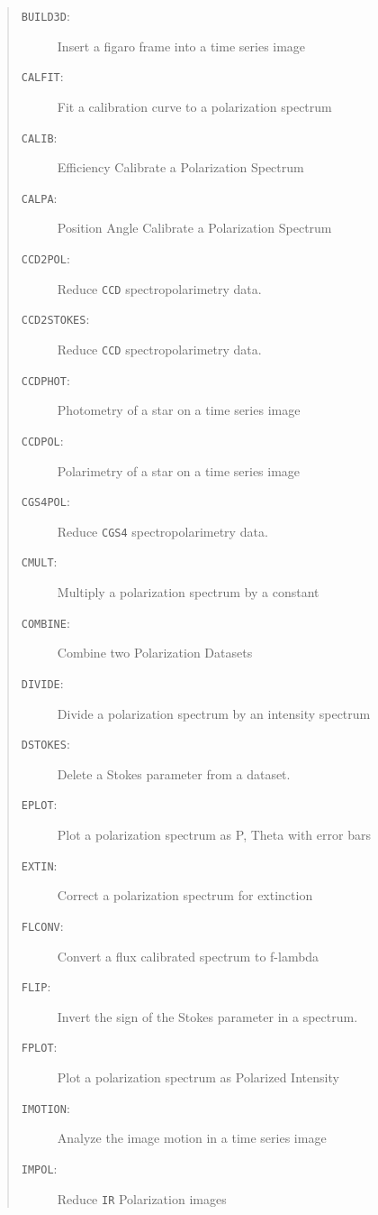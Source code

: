 \documentclass[11pt,twoside]{article}
\renewcommand{\_}{\texttt{\symbol{95}}}
\newenvironment{mansectionroutines}{\begin{quote}\begin{description}}%
{\end{description}\end{quote}}
\newcommand{\mansectionitem}[1]{\item[#1:]\mbox{}}
\newcommand{\mantt}{\tt}
\begin{document}
\begin{mansectionroutines}
\mansectionitem{{\mantt{BUILD3D}}}
        Insert a figaro frame into a time series image

\mansectionitem{{\mantt{CALFIT}}}
        Fit a calibration curve to a polarization spectrum

\mansectionitem{{\mantt{CALIB}}}
        Efficiency Calibrate a Polarization Spectrum

\mansectionitem{{\mantt{CALPA}}}
        Position Angle Calibrate a Polarization Spectrum

\mansectionitem{{\mantt{CCD2POL}}}
        Reduce {\mantt{CCD}} spectropolarimetry data.

\mansectionitem{{\mantt{CCD2STOKES}}}
        Reduce {\mantt{CCD}} spectropolarimetry data.

\mansectionitem{{\mantt{CCDPHOT}}}
        Photometry of a star on a time series image

\mansectionitem{{\mantt{CCDPOL}}}
        Polarimetry of a star on a time series image

\mansectionitem{{\mantt{CGS4POL}}}
        Reduce {\mantt{CGS4}} spectropolarimetry data.

\mansectionitem{{\mantt{CMULT}}}
        Multiply a polarization spectrum by a constant

\mansectionitem{{\mantt{COMBINE}}}
        Combine two Polarization Datasets

\mansectionitem{{\mantt{DIVIDE}}}
        Divide a polarization spectrum by an intensity spectrum

\mansectionitem{{\mantt{DSTOKES}}}
        Delete a Stokes parameter from a dataset.

\mansectionitem{{\mantt{EPLOT}}}
        Plot a polarization spectrum as P, Theta with error bars

\mansectionitem{{\mantt{EXTIN}}}
        Correct a polarization spectrum for extinction

\mansectionitem{{\mantt{FLCONV}}}
        Convert a flux calibrated spectrum to f-lambda

\mansectionitem{{\mantt{FLIP}}}
        Invert the sign of the Stokes parameter in a spectrum.

\mansectionitem{{\mantt{FPLOT}}}
        Plot a polarization spectrum as Polarized Intensity

\mansectionitem{{\mantt{IMOTION}}}
        Analyze the image motion in a time series image

\mansectionitem{{\mantt{IMPOL}}}
        Reduce {\mantt{IR}} Polarization images


\end{mansectionroutines}
\end{document}
